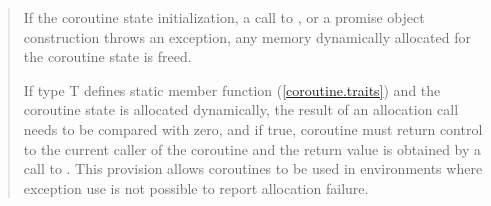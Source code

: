 \begin{quote}
%
%





\pnum
If the coroutine state initialization, a call to , or a promise object construction throws
an exception, 
any memory dynamically allocated 
for the coroutine state is freed.

\pnum
If type T defines static member function  (\ref{coroutine.traits}) and
the coroutine state is allocated dynamically,
the result of an allocation call needs to be compared with
zero, and if true, coroutine must return control 
to the current caller of the coroutine and the return value
is obtained by a call to .
\enternote
This provision allows coroutines to be used in environments
where exception use is not possible to report 
allocation failure.
\exitnote


\end{quote}
